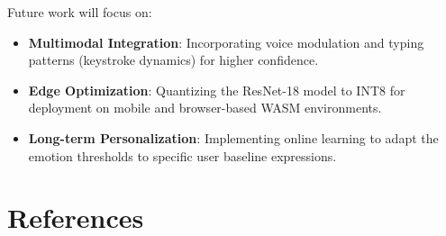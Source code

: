\documentclass[conference]{IEEEtran}
\begin{document}
Future work will focus on:
\begin{itemize}[leftmargin=*]
    \item \textbf{Multimodal Integration}: Incorporating voice modulation and typing patterns (keystroke dynamics) for higher confidence.
    \item \textbf{Edge Optimization}: Quantizing the ResNet-18 model to INT8 for deployment on mobile and browser-based WASM environments.
    \item \textbf{Long-term Personalization}: Implementing online learning to adapt the emotion thresholds to specific user baseline expressions.
\end{itemize}

\section*{References}
\fontsize{10}{12}\selectfont
\end{document}
